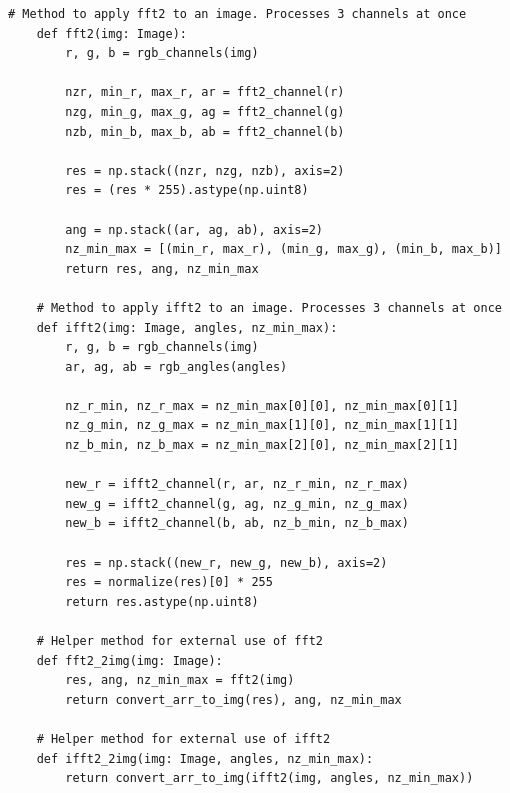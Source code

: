 \documentclass[a4paper, 12pt]{article}
\begin{document}
\begin{lstlisting}[label=task1, caption={Программные методы, необходимые для задания 1}]
    # Method to apply fft2 to an image. Processes 3 channels at once
    def fft2(img: Image):
        r, g, b = rgb_channels(img)
    
        nzr, min_r, max_r, ar = fft2_channel(r)
        nzg, min_g, max_g, ag = fft2_channel(g)
        nzb, min_b, max_b, ab = fft2_channel(b)
    
        res = np.stack((nzr, nzg, nzb), axis=2)
        res = (res * 255).astype(np.uint8)
    
        ang = np.stack((ar, ag, ab), axis=2)
        nz_min_max = [(min_r, max_r), (min_g, max_g), (min_b, max_b)]
        return res, ang, nz_min_max
    
    # Method to apply ifft2 to an image. Processes 3 channels at once
    def ifft2(img: Image, angles, nz_min_max):
        r, g, b = rgb_channels(img)
        ar, ag, ab = rgb_angles(angles)
    
        nz_r_min, nz_r_max = nz_min_max[0][0], nz_min_max[0][1]
        nz_g_min, nz_g_max = nz_min_max[1][0], nz_min_max[1][1]
        nz_b_min, nz_b_max = nz_min_max[2][0], nz_min_max[2][1]
    
        new_r = ifft2_channel(r, ar, nz_r_min, nz_r_max)
        new_g = ifft2_channel(g, ag, nz_g_min, nz_g_max)
        new_b = ifft2_channel(b, ab, nz_b_min, nz_b_max)
    
        res = np.stack((new_r, new_g, new_b), axis=2)
        res = normalize(res)[0] * 255
        return res.astype(np.uint8)

    # Helper method for external use of fft2
    def fft2_2img(img: Image):
        res, ang, nz_min_max = fft2(img)
        return convert_arr_to_img(res), ang, nz_min_max
    
    # Helper method for external use of ifft2
    def ifft2_2img(img: Image, angles, nz_min_max):
        return convert_arr_to_img(ifft2(img, angles, nz_min_max))
    \end{lstlisting}
\end{document}
